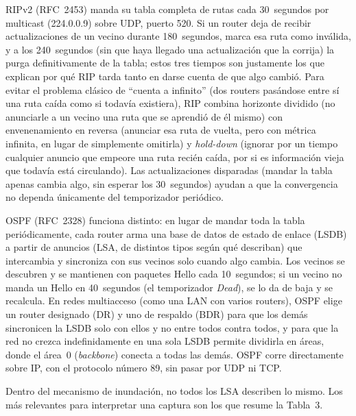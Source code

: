 \documentclass[11pt,a4paper]{article}
\begin{document}
RIPv2 (RFC~2453) manda su tabla completa de rutas cada 30~segundos por multicast (224.0.0.9) sobre UDP, puerto 520. Si un router deja de recibir actualizaciones de un vecino durante 180~segundos, marca esa ruta como inv\'alida, y a los 240~segundos (sin que haya llegado una actualizaci\'on que la corrija) la purga definitivamente de la tabla; estos tres tiempos son justamente los que explican por qu\'e RIP tarda tanto en darse cuenta de que algo cambi\'o. Para evitar el problema cl\'asico de ``cuenta a infinito'' (dos routers pas\'andose entre s\'i una ruta ca\'ida como si todav\'ia existiera), RIP combina horizonte dividido (no anunciarle a un vecino una ruta que se aprendi\'o de \'el mismo) con envenenamiento en reversa (anunciar esa ruta de vuelta, pero con m\'etrica infinita, en lugar de simplemente omitirla) y \textit{hold-down} (ignorar por un tiempo cualquier anuncio que empeore una ruta reci\'en ca\'ida, por si es informaci\'on vieja que todav\'ia est\'a circulando). Las actualizaciones disparadas (mandar la tabla apenas cambia algo, sin esperar los 30~segundos) ayudan a que la convergencia no dependa \'unicamente del temporizador peri\'odico.

OSPF (RFC~2328) funciona distinto: en lugar de mandar toda la tabla peri\'odicamente, cada router arma una base de datos de estado de enlace (LSDB) a partir de anuncios (LSA, de distintos tipos seg\'un qu\'e describan) que intercambia y sincroniza con sus vecinos solo cuando algo cambia. Los vecinos se descubren y se mantienen con paquetes Hello cada 10~segundos; si un vecino no manda un Hello en 40~segundos (el temporizador \textit{Dead}), se lo da de baja y se recalcula. En redes multiacceso (como una LAN con varios routers), OSPF elige un router designado (DR) y uno de respaldo (BDR) para que los dem\'as sincronicen la LSDB solo con ellos y no entre todos contra todos, y para que la red no crezca indefinidamente en una sola LSDB permite dividirla en \'areas, donde el \'area~0 (\textit{backbone}) conecta a todas las dem\'as. OSPF corre directamente sobre IP, con el protocolo n\'umero 89, sin pasar por UDP ni TCP.

Dentro del mecanismo de inundaci\'on, no todos los LSA describen lo mismo. Los m\'as relevantes para interpretar una captura son los que resume la Tabla~3.
\end{document}
